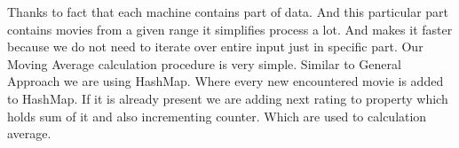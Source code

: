 Thanks to fact that each machine contains part of data. And this particular part contains movies from
a given range it simplifies process a lot. And makes it faster because we do not need to iterate over entire
input just in specific part.
Our Moving Average calculation procedure is very simple. Similar to General Approach
we are using HashMap. Where every new encountered movie is added to HashMap. If it is already
present we are adding next rating to property which holds sum of it and also incrementing counter.
Which are used to calculation average.







